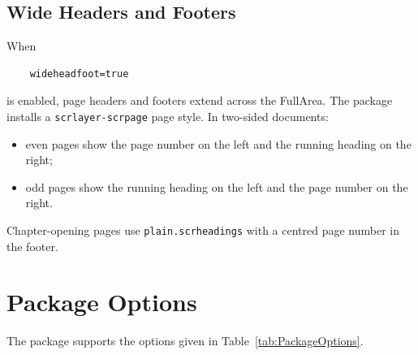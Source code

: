 \documentclass[
11pt,
a4paper,
oneside
]{scrbook}
\begin{document}
\section{Wide Headers and Footers}

When
\begin{verbatim}
	wideheadfoot=true
\end{verbatim}
	is enabled, page headers and footers extend across the FullArea.
	The package installs a \texttt{scrlayer-scrpage} page style.
	In two-sided documents:
	\begin{itemize}
		\item even pages show the page number on the left and the running heading
		on the right;
		\item odd pages show the running heading on the left and the page number
		on the right.
	\end{itemize}
	Chapter-opening pages use \texttt{plain.scrheadings} with a centred page
	number in the footer.
	
\chapter{Package Options}
\label{chap:options}
The \mdlayout{} package supports the options given in
Table~\ref{tab:PackageOptions}.
\end{document}
